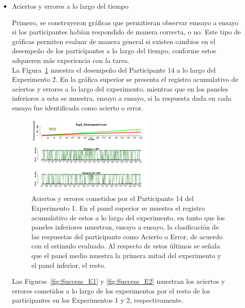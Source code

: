 \begin{itemize}
\item Aciertos y errores a lo largo del tiempo

Primero, se construyeron gráficas que permitieran observar emsayo a ensayo si los participantes habían respondido de manera correcta, o no. Este tipo de gráficas permiten evaluar de manera general si existen cambios en el desempeño de los participantes a lo largo del tiempo, conforme estos adquieren más experiencia con la tarea.\\

La Figura~\ref{fig:Success_E1_P14} muestra el desempeño del Participante 14 a lo largo del Experimento 2. En la gráfica superior se presenta el registro acumulativo de aciertos y errores a lo largo del experimento, mientras que en los paneles inferiores a esta se muestra, ensayo a ensayo, si la respuesta dada en cada ensayo fue identificada como acierto o error.\\


\begin{figure}[th]
\centering
\includegraphics[width=0.60\textwidth]{Figures/Success_Exp2_P14}
\caption[Aciertos y errores a lo largo del tiempo: Participante ejemplar]{Aciertos y errores cometidos por el Participante 14 del Experimento 1. En el panel superior se muestra el registro acumulativo de estos a lo largo del experimento, en tanto que los paneles inferiores muestran, ensayo a ensayo, la clasificación de las respuestas del participante como Acierto o Error, de acuerdo con el estímulo evaluado. Al respecto de estos últimos se señala que el panel medio muestra la primera mitad del experimento y el panel inferior, el resto.}
\label{fig:Success_E1_P14}
\end{figure}

Las Figuras~\ref{fig:Success_E1} y \ref{fig:Success_E2} muestran los aciertos y errores cometidos a lo largo de los experimentos por el resto de los participantes en los Experimentos 1 y 2, respectivamente.\\



\end{itemize}
